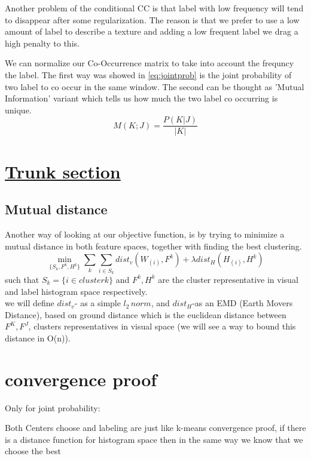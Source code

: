\documentclass{article}
\begin{document}
Another problem of the conditional CC is that label with low frequency will tend to disappear after some regularization. The reason is that we prefer to use a low amount of label to describe a texture and adding a low frequent label we drag a high penalty to this.

We can normalize our Co-Occurrence matrix to take into account the frequncy the label.
The first way was showed in \eqref{eq:jointprob} is the joint probability of two label to co occur in the same window.
The second can be thought as 'Mutual Information' variant which tells us how much the two label co occurring is unique.
\begin{equation}
M(K;J)=\dfrac{P(K|J)}{|K|}
\end{equation} 







\newpage
\section{\underline{Trunk section}}
\subsection{Mutual distance}
Another way of looking at our objective function, is by trying to minimize a mutual distance in both feature spaces, together with finding the best clustering.
\begin{equation}
\min_{\{S_k , F^k,H^k\}} \sum_k \sum_{i\in S_k} dist_v(W_{(i)},F^k)+\lambda dist_H(H_{(i)},H^k)
\end{equation}
such that $ S_k=\{i\in cluster k\} $ and $ F^k,H^k $ are the cluster representative in visual and label histogram space respectively.\\
we will define $ dist_v $- as a simple $ l_2\,norm $, and $ dist_H $-as an EMD (Earth Movers Distance), based on ground distance which is the euclidean distance between $ F^K,F^J $, clusters representatives in visual space (we will see a way to bound this distance in O(n)).\\

\section{convergence proof}
Only for joint probability:

Both Centers choose and labeling are just like k-means convergence proof, if there is a distance function for histogram space then in the same way we know that we choose the best 
\end{document}
